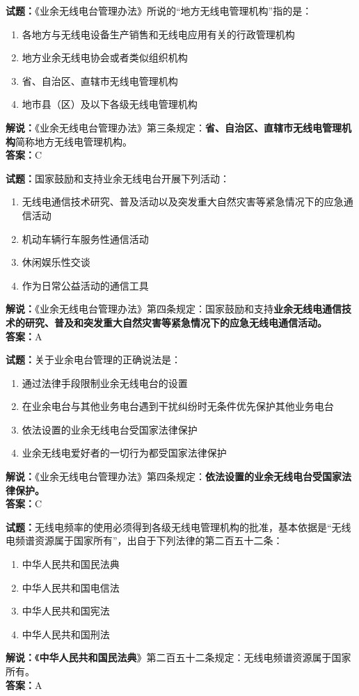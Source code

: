 \documentclass{ctexbook}
\begin{document}
\bigskip


\noindent\textbf{试题：}《业余无线电台管理办法》所说的“地方无线电管理机构”指的是：
\begin{enumerate}[leftmargin=3em]
\item 各地方与无线电设备生产销售和无线电应用有关的行政管理机构
\item 地方业余无线电协会或者类似组织机构
\item 省、自治区、直辖市无线电管理机构
\item 地市县（区）及以下各级无线电管理机构
\end{enumerate}
\noindent\textbf{解说：}《业余无线电台管理办法》第三条规定：\textbf{省、自治区、直辖市无线电管理机构}简称地方无线电管理机构。\\\noindent\textbf{答案：}C

\bigskip


\noindent\textbf{试题：}国家鼓励和支持业余无线电台开展下列活动：
\begin{enumerate}[leftmargin=3em]
\item 无线电通信技术研究、普及活动以及突发重大自然灾害等紧急情况下的应急通信活动
\item 机动车辆行车服务性通信活动
\item 休闲娱乐性交谈
\item 作为日常公益活动的通信工具
\end{enumerate}
\noindent\textbf{解说：}《业余无线电台管理办法》第四条规定：国家鼓励和支持\textbf{业余无线电通信技术的研究、普及和突发重大自然灾害等紧急情况下的应急无线电通信活动。}\\\noindent\textbf{答案：}A

\bigskip


\noindent\textbf{试题：}关于业余电台管理的正确说法是：
\begin{enumerate}[leftmargin=3em]
\item 通过法律手段限制业余无线电台的设置
\item 在业余电台与其他业务电台遇到干扰纠纷时无条件优先保护其他业务电台
\item 依法设置的业余无线电台受国家法律保护
\item 业余无线电爱好者的一切行为都受国家法律保护
\end{enumerate}
\noindent\textbf{解说：}《业余无线电台管理办法》第四条规定：\textbf{依法设置的业余无线电台受国家法律保护。}\\\noindent\textbf{答案：}C

\bigskip


\noindent\textbf{试题：}无线电频率的使用必须得到各级无线电管理机构的批准，基本依据是“无线电频谱资源属于国家所有”，出自于下列法律的第二百五十二条：
\begin{enumerate}[leftmargin=3em]
\item 中华人民共和国民法典
\item 中华人民共和国电信法
\item 中华人民共和国宪法
\item 中华人民共和国刑法
\end{enumerate}
\noindent\textbf{解说：}《\textbf{中华人民共和国民法典}》第二百五十二条规定：无线电频谱资源属于国家所有。\\\noindent\textbf{答案：}A
\end{document}
